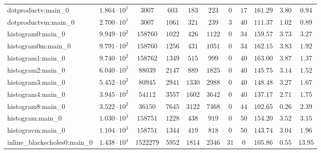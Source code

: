 \begin{tabular}{|l|c|c|c|c|c|c|c|c|c|c|}
dotproductv:main\_0            & $ 1.864 \cdot 10^{1} $ & $ 3007     $ & $ 603    $ & $ 183    $ & $ 223    $ & $ 0    $ & $ 17   $ & $ 161.29      $ & $ 3.80    $ & $ 0.94    $ \\
dotproductvm:main\_0           & $ 2.700 \cdot 10^{1} $ & $ 3007     $ & $ 1061   $ & $ 321    $ & $ 239    $ & $ 3    $ & $ 40   $ & $ 111.37      $ & $ 1.02    $ & $ 0.89    $ \\
histogram0:main\_0             & $ 9.949 \cdot 10^{2} $ & $ 158760   $ & $ 1022   $ & $ 426    $ & $ 1122   $ & $ 0    $ & $ 34   $ & $ 159.57      $ & $ 3.73    $ & $ 3.27    $ \\
histogram0m:main\_0            & $ 9.791 \cdot 10^{2} $ & $ 158760   $ & $ 1256   $ & $ 431    $ & $ 1051   $ & $ 0    $ & $ 34   $ & $ 162.15      $ & $ 3.83    $ & $ 1.92    $ \\
histogram1:main\_0             & $ 9.740 \cdot 10^{2} $ & $ 158762   $ & $ 1349   $ & $ 515    $ & $ 999    $ & $ 0    $ & $ 40   $ & $ 163.00      $ & $ 3.87    $ & $ 1.37    $ \\
histogram2:main\_0             & $ 6.040 \cdot 10^{2} $ & $ 88039    $ & $ 2147   $ & $ 889    $ & $ 1825   $ & $ 0    $ & $ 40   $ & $ 145.75      $ & $ 3.14    $ & $ 1.52    $ \\
histogram3:main\_0             & $ 5.452 \cdot 10^{2} $ & $ 80945    $ & $ 2941   $ & $ 1330   $ & $ 2988   $ & $ 0    $ & $ 40   $ & $ 148.48      $ & $ 3.27    $ & $ 1.67    $ \\
histogram4:main\_0             & $ 3.945 \cdot 10^{2} $ & $ 54112    $ & $ 3557   $ & $ 1602   $ & $ 3642   $ & $ 0    $ & $ 40   $ & $ 137.17      $ & $ 2.71    $ & $ 1.75    $ \\
histogram8:main\_0             & $ 3.522 \cdot 10^{2} $ & $ 36150    $ & $ 7645   $ & $ 3122   $ & $ 7468   $ & $ 0    $ & $ 44   $ & $ 102.65      $ & $ 0.26    $ & $ 2.39    $ \\
histogram:main\_0              & $ 1.030 \cdot 10^{3} $ & $ 158751   $ & $ 1228   $ & $ 438    $ & $ 919    $ & $ 0    $ & $ 50   $ & $ 154.20      $ & $ 3.52    $ & $ 3.15    $ \\
histogravm:main\_0             & $ 1.104 \cdot 10^{3} $ & $ 158751   $ & $ 1344   $ & $ 419    $ & $ 818    $ & $ 0    $ & $ 50   $ & $ 143.74      $ & $ 3.04    $ & $ 1.96    $ \\
inline\_blackscholes0:main\_0  & $ 1.438 \cdot 10^{4} $ & $ 1522279  $ & $ 5952   $ & $ 1814   $ & $ 2346   $ & $ 31   $ & $ 0    $ & $ 105.86      $ & $ 0.55    $ & $ 13.95   $ \\

\end{tabular}
